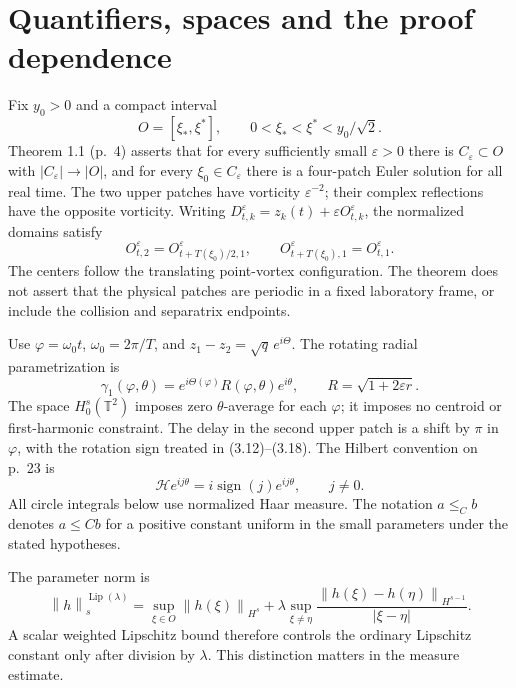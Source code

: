 \documentclass[10pt]{article}
\begin{document}
\section*{Quantifiers, spaces and the proof dependence}
Fix \(y_0>0\) and a compact interval \[O=[\xi_*,\xi^*],\qquad
  0<\xi_*<\xi^*<y_0/\sqrt2.\] Theorem 1.1 (p. 4) asserts that for every sufficiently small \(\varepsilon>0\) there is \(C_\varepsilon\subset O\) with \(|C_\varepsilon|\to |O|\), and for every \(\xi_0\in C_\varepsilon\) there is a four-patch Euler solution for all real time. The two upper patches have vorticity \(\varepsilon^{-2}\); their complex reflections have the opposite vorticity. Writing \(D_{t,k}^\varepsilon=z_k(t)+\varepsilon O_{t,k}^\varepsilon\), the normalized domains satisfy \[O_{t,2}^\varepsilon=O_{t+T(\xi_0)/2,1}^\varepsilon,\qquad
 O_{t+T(\xi_0),1}^\varepsilon=O_{t,1}^\varepsilon.\] The centers follow the translating point-vortex configuration. The theorem does not assert that the physical patches are periodic in a fixed laboratory frame, or include the collision and separatrix endpoints.\par
Use \(\varphi=\omega_0t\), \(\omega_0=2\pi/T\), and \(z_1-z_2=\sqrt q\,e^{i\Theta}\). The rotating radial parametrization is \[\gamma_1(\varphi,\theta)
  =e^{i\Theta(\varphi)}R(\varphi,\theta)e^{i\theta},
 \qquad R=\sqrt{1+2\varepsilon r}.\] The space \(H_0^s(\mathbb T^2)\) imposes zero \(\theta\)-average for each \(\varphi\); it imposes no centroid or first-harmonic constraint. The delay in the second upper patch is a shift by \(\pi\) in \(\varphi\), with the rotation sign treated in (3.12)–(3.18). The Hilbert convention on p. 23 is \[\mathcal He^{ij\theta}=i\operatorname{sign}(j)e^{ij\theta},\qquad j\ne0.\] All circle integrals below use normalized Haar measure. The notation \(a\leq_C b\) denotes \(a\leq Cb\) for a positive constant uniform in the small parameters under the stated hypotheses.\par
The parameter norm is \[\left\lVert h\right\rVert_s^{\operatorname{Lip}(\lambda)}
  =\sup_{\xi\in O}\left\lVert h(\xi)\right\rVert_{H^s}
   +\lambda\sup_{\xi\ne\eta}
       \frac{\left\lVert h(\xi)-h(\eta)\right\rVert_{H^{s-1}}}{|\xi-\eta|}.\] A scalar weighted Lipschitz bound therefore controls the ordinary Lipschitz constant only after division by \(\lambda\). This distinction matters in the measure estimate.\par
\end{document}
